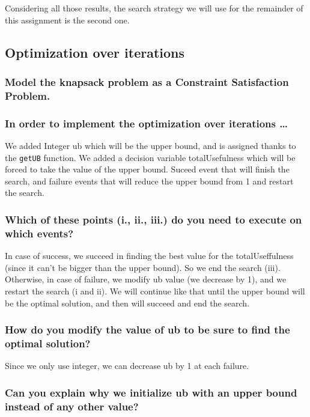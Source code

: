 \documentclass[a4paper ,12pt,french]{article}
\begin{document}
Considering all those results, the search strategy we will use for the remainder of this assignment is the second one.

\subsection{Optimization over iterations}

\subsubsection{Model the knapsack problem as a Constraint Satisfaction Problem.}



\subsubsection{In order to implement the optimization over iterations \dots}

We added Integer ub which will be the upper bound, and is assigned thanks to the \texttt{getUB} function. We added a decision variable totalUsefulness which will be forced to take the value of the upper bound. Suceed event that will finish the search, and failure events that will reduce the upper bound from 1 and restart the search.

\subsubsection{Which of these points (i., ii., iii.) do you need to execute on which events?}
In case of success, we succeed in finding the best value for the totalUseffulness (since it can't be bigger than the upper bound). So we end the search (iii). Otherwise, in case of failure, we modify ub value (we decrease by 1), and we restart the search (i and ii).
We will continue like that until the upper bound will be the optimal solution, and then will succeed and end the search.


\subsubsection{How do you modify the value of ub to be sure to find the optimal solution?}

Since we only use integer, we can decrease ub by 1 at each failure.

\subsubsection{Can you explain why we initialize ub with an upper bound instead of any other value?}
\end{document}
